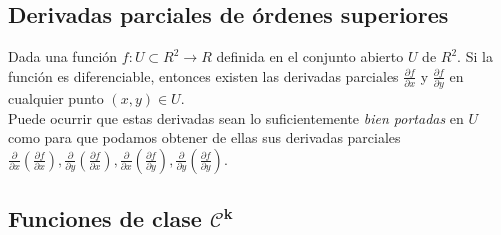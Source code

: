 \documentclass[twoside]{article}
\numberwithin{equation}{section}
\numberwithin{figure}{section}
\numberwithin{table}{section}
\begin{document}
				\subsection{Derivadas parciales de órdenes superiores}

					Dada una función $f:U\subset R^2 \rightarrow R$ definida en el conjunto abierto $U$ de $R^2$. Si la función es diferenciable, entonces existen las derivadas parciales $\frac{\partial f}{\partial x}$ y $\frac{\partial f}{\partial y}$ en cualquier punto $(x,y)\in U$.\\
					
					Puede ocurrir que estas derivadas sean lo suficientemente \emph{bien	portadas} en $U$ como para que podamos obtener de ellas sus derivadas parciales $\frac{\partial}{\partial x}\left(\frac{\partial f}{\partial x}\right),\frac{\partial}{\partial y}\left(\frac{\partial f}{\partial x}\right),\frac{\partial}{\partial x}\left(\frac{\partial f}{\partial y}\right),\frac{\partial}{\partial y}\left(\frac{\partial f}{\partial y}\right)$.\\
					
				
				\subsection{Funciones de clase $\mathcal{C}^{\mathbf{k}}$}
				
\end{document}
